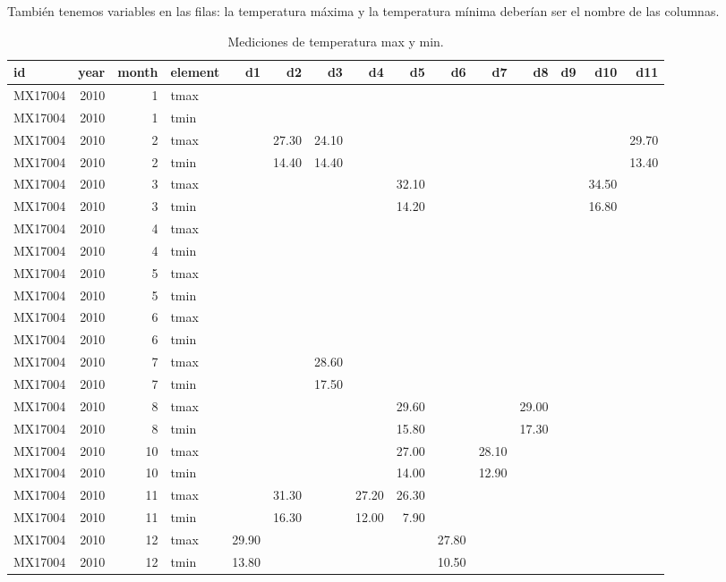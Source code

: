 \documentclass[]{article}
\begin{document}
También tenemos variables en las filas: la temperatura máxima y la
temperatura mínima deberían ser el nombre de las columnas.

\begin{table}[ht]
\centering
\begingroup\tiny
\begin{tabular}{lrrlrrrrrrrrrrr}
  \hline
id & year & month & element & d1 & d2 & d3 & d4 & d5 & d6 & d7 & d8 & d9 & d10 & d11 \\ 
  \hline
MX17004 & 2010 &   1 & tmax &  &  &  &  &  &  &  &  &  &  &  \\ 
  MX17004 & 2010 &   1 & tmin &  &  &  &  &  &  &  &  &  &  &  \\ 
  MX17004 & 2010 &   2 & tmax &  & 27.30 & 24.10 &  &  &  &  &  &  &  & 29.70 \\ 
  MX17004 & 2010 &   2 & tmin &  & 14.40 & 14.40 &  &  &  &  &  &  &  & 13.40 \\ 
  MX17004 & 2010 &   3 & tmax &  &  &  &  & 32.10 &  &  &  &  & 34.50 &  \\ 
  MX17004 & 2010 &   3 & tmin &  &  &  &  & 14.20 &  &  &  &  & 16.80 &  \\ 
  MX17004 & 2010 &   4 & tmax &  &  &  &  &  &  &  &  &  &  &  \\ 
  MX17004 & 2010 &   4 & tmin &  &  &  &  &  &  &  &  &  &  &  \\ 
  MX17004 & 2010 &   5 & tmax &  &  &  &  &  &  &  &  &  &  &  \\ 
  MX17004 & 2010 &   5 & tmin &  &  &  &  &  &  &  &  &  &  &  \\ 
  MX17004 & 2010 &   6 & tmax &  &  &  &  &  &  &  &  &  &  &  \\ 
  MX17004 & 2010 &   6 & tmin &  &  &  &  &  &  &  &  &  &  &  \\ 
  MX17004 & 2010 &   7 & tmax &  &  & 28.60 &  &  &  &  &  &  &  &  \\ 
  MX17004 & 2010 &   7 & tmin &  &  & 17.50 &  &  &  &  &  &  &  &  \\ 
  MX17004 & 2010 &   8 & tmax &  &  &  &  & 29.60 &  &  & 29.00 &  &  &  \\ 
  MX17004 & 2010 &   8 & tmin &  &  &  &  & 15.80 &  &  & 17.30 &  &  &  \\ 
  MX17004 & 2010 &  10 & tmax &  &  &  &  & 27.00 &  & 28.10 &  &  &  &  \\ 
  MX17004 & 2010 &  10 & tmin &  &  &  &  & 14.00 &  & 12.90 &  &  &  &  \\ 
  MX17004 & 2010 &  11 & tmax &  & 31.30 &  & 27.20 & 26.30 &  &  &  &  &  &  \\ 
  MX17004 & 2010 &  11 & tmin &  & 16.30 &  & 12.00 & 7.90 &  &  &  &  &  &  \\ 
  MX17004 & 2010 &  12 & tmax & 29.90 &  &  &  &  & 27.80 &  &  &  &  &  \\ 
  MX17004 & 2010 &  12 & tmin & 13.80 &  &  &  &  & 10.50 &  &  &  &  &  \\ 
   \hline
\end{tabular}
\endgroup
\caption{Mediciones de temperatura max y min.} 
\label{tab:clima}
\end{table}
\end{document}
